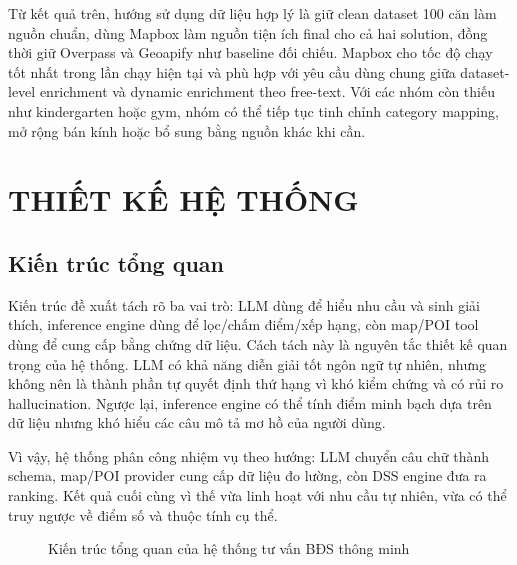 \documentclass[a4paper,12pt]{article}
\begin{document}
Từ kết quả trên, hướng sử dụng dữ liệu hợp lý là giữ clean dataset 100 căn làm nguồn chuẩn, dùng Mapbox làm nguồn tiện ích final cho cả hai solution, đồng thời giữ Overpass và Geoapify như baseline đối chiếu. Mapbox cho tốc độ chạy tốt nhất trong lần chạy hiện tại và phù hợp với yêu cầu dùng chung giữa dataset-level enrichment và dynamic enrichment theo free-text. Với các nhóm còn thiếu như kindergarten hoặc gym, nhóm có thể tiếp tục tinh chỉnh category mapping, mở rộng bán kính hoặc bổ sung bằng nguồn khác khi cần.

\section{THIẾT KẾ HỆ THỐNG}

\subsection{Kiến trúc tổng quan}
Kiến trúc đề xuất tách rõ ba vai trò: LLM dùng để hiểu nhu cầu và sinh giải thích, inference engine dùng để lọc/chấm điểm/xếp hạng, còn map/POI tool dùng để cung cấp bằng chứng dữ liệu. Cách tách này là nguyên tắc thiết kế quan trọng của hệ thống. LLM có khả năng diễn giải tốt ngôn ngữ tự nhiên, nhưng không nên là thành phần tự quyết định thứ hạng vì khó kiểm chứng và có rủi ro hallucination. Ngược lại, inference engine có thể tính điểm minh bạch dựa trên dữ liệu nhưng khó hiểu các câu mô tả mơ hồ của người dùng.

Vì vậy, hệ thống phân công nhiệm vụ theo hướng: LLM chuyển câu chữ thành schema, map/POI provider cung cấp dữ liệu đo lường, còn DSS engine đưa ra ranking. Kết quả cuối cùng vì thế vừa linh hoạt với nhu cầu tự nhiên, vừa có thể truy ngược về điểm số và thuộc tính cụ thể.

\begin{figure}[H]
\centering
{}
\caption{Kiến trúc tổng quan của hệ thống tư vấn BĐS thông minh}
\label{fig:architecture}
\end{figure}
\end{document}
